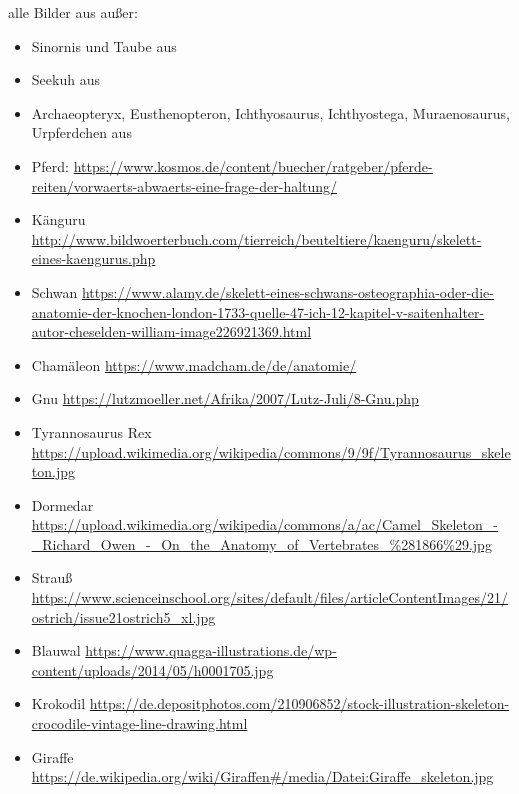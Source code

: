  alle Bilder aus \cite{Spezielle_Zoologie} außer:
 \begin{itemize}
  \item Sinornis und Taube aus \cite{Vergleichende_Anatomie}
  \item Seekuh aus \cite{Zoologie25Wehner}
  \item Archaeopteryx, Eusthenopteron, Ichthyosaurus, Ichthyostega, Muraenosaurus, Urpferdchen aus \cite{Zoologie24Wehner}
  \item Pferd: \url{https://www.kosmos.de/content/buecher/ratgeber/pferde-reiten/vorwaerts-abwaerts-eine-frage-der-haltung/}
  \item Känguru \url{http://www.bildwoerterbuch.com/tierreich/beuteltiere/kaenguru/skelett-eines-kaengurus.php}
  \item Schwan \url{https://www.alamy.de/skelett-eines-schwans-osteographia-oder-die-anatomie-der-knochen-london-1733-quelle-47-ich-12-kapitel-v-saitenhalter-autor-cheselden-william-image226921369.html}
  \item Chamäleon \url{https://www.madcham.de/de/anatomie/}
  \item Gnu \url{https://lutzmoeller.net/Afrika/2007/Lutz-Juli/8-Gnu.php}
  \item Tyrannosaurus Rex \url{https://upload.wikimedia.org/wikipedia/commons/9/9f/Tyrannosaurus_skeleton.jpg}
  \item Dormedar \url{https://upload.wikimedia.org/wikipedia/commons/a/ac/Camel_Skeleton_-_Richard_Owen_-_On_the_Anatomy_of_Vertebrates_\%281866\%29.jpg}
  \item Strauß \url{https://www.scienceinschool.org/sites/default/files/articleContentImages/21/ostrich/issue21ostrich5_xl.jpg}
  \item Blauwal \url{https://www.quagga-illustrations.de/wp-content/uploads/2014/05/h0001705.jpg}
  \item Krokodil \url{https://de.depositphotos.com/210906852/stock-illustration-skeleton-crocodile-vintage-line-drawing.html}
  \item Giraffe \url{https://de.wikipedia.org/wiki/Giraffen#/media/Datei:Giraffe_skeleton.jpg}
 \end{itemize}

 
